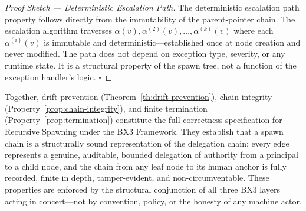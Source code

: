 \begin{proof}[Proof Sketch --- Deterministic Escalation Path]
The deterministic escalation path property follows directly from the immutability of the parent-pointer chain. The escalation algorithm traverses $\alpha(v), \alpha^{(2)}(v), \ldots, \alpha^{(k)}(v)$ where each $\alpha^{(i)}(v)$ is immutable and deterministic---established once at node creation and never modified. The path does not depend on exception type, severity, or any runtime state. It is a structural property of the spawn tree, not a function of the exception handler's logic. $\square$
\end{proof}

\bigskip
\noindent Together, drift prevention (Theorem~\ref{th:drift-prevention}), chain integrity (Property~\ref{prop:chain-integrity}), and finite termination (Property~\ref{prop:termination}) constitute the full correctness specification for Recursive Spawning under the BX3 Framework. They establish that a spawn chain is a structurally sound representation of the delegation chain: every edge represents a genuine, auditable, bounded delegation of authority from a principal to a child node, and the chain from any leaf node to its human anchor is fully recorded, finite in depth, tamper-evident, and non-circumventable. These properties are enforced by the structural conjunction of all three BX3 layers acting in concert---not by convention, policy, or the honesty of any machine actor.
